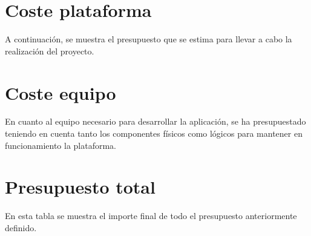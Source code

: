 
\section{Coste plataforma}
\label{8:sec:1}

A continuación, se muestra el presupuesto que se estima para llevar a cabo la realización del proyecto.



\section{Coste equipo}
\label{8:sec:2}

En cuanto al equipo necesario para desarrollar la aplicación, se ha presupuestado teniendo en cuenta tanto los componentes físicos como lógicos
para mantener en funcionamiento la plataforma.



\newpage
\section{Presupuesto total}
\label{8:sec:3}

En esta tabla se muestra el importe final de todo el presupuesto anteriormente definido.


